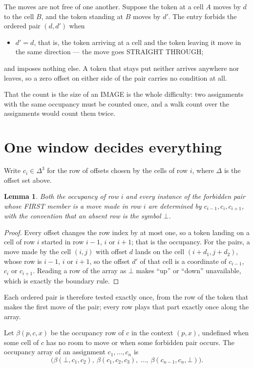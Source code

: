 \documentclass[11pt,a4paper]{article}
\theoremstyle{plain}
\newtheorem{lemma}[theorem]{Lemma}
\theoremstyle{definition}
\begin{document}
The moves are not free of one another. Suppose the token at a cell $A$ moves by $d$ to the
cell $B$, and the token standing at $B$ moves by $d'$. The entry forbids the ordered pair
$(d,d')$ when
\begin{itemize}
\item $d'=d$, that is, the token arriving at a cell and the token leaving it move in the same direction --- the move goes STRAIGHT THROUGH;
\end{itemize}
and imposes nothing else. A token that stays put neither arrives anywhere nor leaves, so a
zero offset on either side of the pair carries no condition at all.

That the count is the size of an IMAGE is the whole difficulty: two assignments with the same
occupancy must be counted once, and a walk count over the assignments would count them twice.

\section{One window decides everything}

Write $c_i\in\Delta^{3}$ for the row of offsets chosen by the cells of row $i$, where
$\Delta$ is the offset set above.

\begin{lemma}\label{lem:win}
Both the occupancy of row $i$ and every instance of the forbidden pair whose FIRST member is a
move made in row $i$ are determined by $c_{i-1},c_i,c_{i+1}$, with the convention that an
absent row is the symbol $\bot$.
\end{lemma}

\begin{proof}
Every offset changes the row index by at most one, so a token landing on a cell of row $i$
started in row $i-1$, $i$ or $i+1$; that is the occupancy. For the pairs, a move made by the
cell $(i,j)$ with offset $d$ lands on the cell $(i+d_1,j+d_2)$, whose row is $i-1$, $i$ or
$i+1$, so the offset $d'$ of that cell is a coordinate of $c_{i-1}$, $c_i$ or $c_{i+1}$.
Reading a row of the array as $\bot$ makes ``up'' or ``down'' unavailable, which is exactly
the boundary rule.
\end{proof}

Each ordered pair is therefore tested exactly once, from the row of the token that makes the
first move of the pair; every row plays that part exactly once along the array.

Let $\beta(p,c,x)$ be the occupancy row of $c$ in the context $(p,x)$, undefined when some
cell of $c$ has no room to move or when some forbidden pair occurs. The occupancy array of an
assignment $c_1,\dots,c_n$ is
\[
\bigl(\beta(\bot,c_1,c_2),\ \beta(c_1,c_2,c_3),\ \dots,\ \beta(c_{n-1},c_n,\bot)\bigr).
\]
\end{document}
